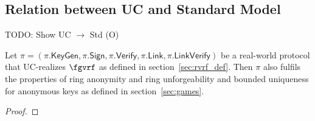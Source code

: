 \subsection{Relation between UC and Standard Model}
TODO: Show UC $ \rightarrow  $ Std (O)
{\color{blue}\begin{theorem} Let $\pi = (\pi.\mathsf{KeyGen}, \pi.\mathsf{Sign}, \pi.\mathsf{Verify}, \pi.\mathsf{Link}, \pi.\mathsf{LinkVerify})$ 
be a real-world protocol that UC-realizes $\fgvrf$ as defined in section~\ref{sec:rvrf_def}. Then $\pi$ also fulfils the properties 
of ring anonymity and ring unforgeability and bounded uniqueness for anonymous keys 
as defined in section~\ref{sec:games}. 
\end{theorem}

\begin{proof}
\end{proof}}